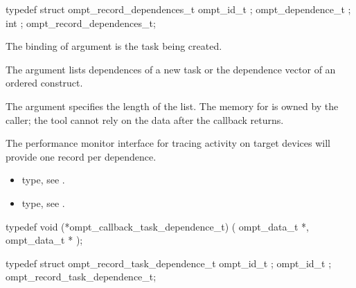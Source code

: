 \record

\begin{ccppspecific}
\begin{omptRecord}
typedef struct ompt_record_dependences_t {
  ompt_id_t ;
  ompt_dependence_t ;
  int ;
} ompt_record_dependences_t;
\end{omptRecord}
\end{ccppspecific}



\argdesc

The binding of argument  is the task being created.

The argument  lists dependences of a new task or the dependence vector of an 
ordered construct.

The argument  specifies the length of the list.
The memory for  is owned by the caller; the tool cannot rely on
the data after the callback returns.

The performance monitor interface for tracing activity on target devices will provide one record per dependence.

\crossreferences
\begin{itemize}
\item {} type, see
.
\item {} type, see
.
\end{itemize}



\label{sec:ompt_callback_task_dependence_t}
\format

\begin{ccppspecific}
\begin{omptCallback}
typedef void (*ompt_callback_task_dependence_t) (
  ompt_data_t *,
  ompt_data_t *
);
\end{omptCallback}
\end{ccppspecific}


\record

\begin{ccppspecific}
\begin{omptRecord}
typedef struct ompt_record_task_dependence_t {
  ompt_id_t ;
  ompt_id_t ;
} ompt_record_task_dependence_t;
\end{omptRecord}
\end{ccppspecific}


